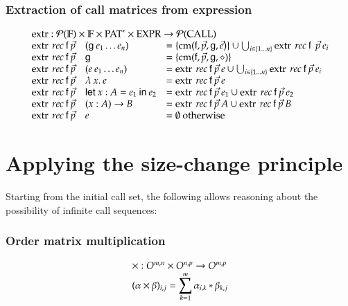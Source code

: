 \subsubsection{Extraction of call matrices from expression}
\[
\begin{array}[t]{ll}
\multicolumn{2}{l}{\extr : \pset{\cF} \times \cF \times \ves{\Pat} \times \Expr \ra \pset{\call}}\\ 
\extr \: rec \: \ff \: \vec{p} \quad (\fg \: e_1 \ldots e_n) & = \{ \cm (\ff,\vec{p},\fg,\vec{e}) \} \cup \bigcup_{i \in \{ 1 \ldots n \}} \extr \: rec \: \ff \: \: \vec{p} \: e_i \\
\extr \: rec \: \ff \: \vec{p} \quad \fg & =  \{ \cm (\ff,\vec{p},\fg,\diamond) \} \\
\extr \: rec \: \ff \: \vec{p} \quad (e \: e_1 \ldots e_n) & =  \extr \: rec \: \ff \: \vec{p} \: e \cup \bigcup_{i \in \{ 1 \ldots n \}} \extr \: rec \: \ff \: \vec{p} \: e_i\\ 
\extr \: rec \: \ff \: \vec{p} \quad \lam{x}e & = \extr \: rec \: \ff \: \vec{p} \: e \\
\extr \: rec \: \ff \: \vec{p} \quad \ELet{x}{A}{e_1}{e_2} & = \extr \: rec \: \ff \: \vec{p} \: e_1 \cup \extr \: rec \: \ff \: \vec{p} \: e_2 \\
\extr \: rec \: \ff \: \vec{p} \quad \EPi{x}{A}{B} & =  \extr \: rec \: \ff \: \vec{p} \: A \cup \extr \: rec \: \ff \: \vec{p} \: B \\ 
\extr \: rec \: \ff \: \vec{p} \quad e & = \emptyset \mbox{ otherwise}   
\end{array}
\]


\section{Applying the size-change principle}

Starting from the initial call set, the following allows reasoning about the possibility of infinite call sequences:

\subsubsection{Order matrix multiplication}
\[ 
\begin{array}[t]{l}
\times : O^{m,n} \times O^{n,p} \rightarrow O^{m,p} \\
   (\alpha \times \beta)_{i,j} = \displaystyle\sum^{m}_{k=1}{\alpha_{i,k} * \beta_{k,j}}
\end{array}
\]

